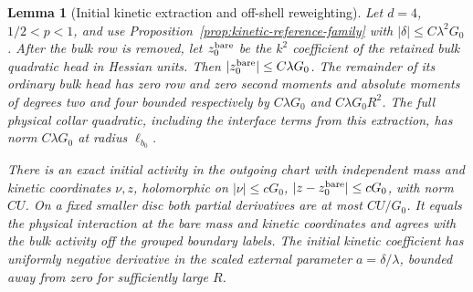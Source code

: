 \documentclass[11pt]{article}
\newtheorem{lemma}[theorem]{Lemma}
\theoremstyle{definition}
\begin{document}
\begin{lemma}[Initial kinetic extraction and off-shell reweighting]
\label{lem:kinetic-initial-extraction}
Let \(d=4\), \(1/2<p<1\), and use
Proposition~\ref{prop:kinetic-reference-family} with
\(|\delta|\le C\lambda^2G_0\).
After the bulk row is removed, let \(z_0^{\rm bare}\)
be the \(k^2\) coefficient of the retained bulk
quadratic head in Hessian units. Then
\(|z_0^{\rm bare}|\le C\lambda G_0\).
The remainder of its ordinary bulk head has zero row
and zero second moments and absolute moments of degrees
two and four bounded respectively by \(C\lambda G_0\)
and \(C\lambda G_0R^2\). The full physical collar
quadratic, including the interface terms from this
extraction, has norm \(C\lambda G_0\) at radius
\(\ell_{b_0}\).

There is an exact initial activity in the outgoing chart
with independent mass and kinetic coordinates \(\nu,z\),
holomorphic on \(|\nu|\le cG_0\),
\(|z-z_0^{\rm bare}|\le cG_0\), with norm \(CU\).
On a fixed smaller disc both partial derivatives are
at most \(CU/G_0\). It equals the physical interaction
at the bare mass and kinetic coordinates and
agrees with the bulk activity off the grouped
boundary labels. The initial kinetic coefficient has
uniformly negative derivative in the scaled external
parameter \(a=\delta/\lambda\), bounded away from zero
for sufficiently large \(R\).
\end{lemma}
\end{document}
